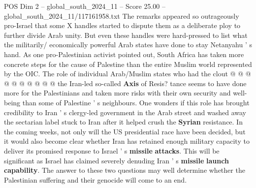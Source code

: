 \begin{textsample}{POS Dim 2 – global\_south\_2024\_11 – Score 25.00 – global\_south\_2024\_11/117161958.txt}
The remarks appeared so outrageously pro-Israel that some X handles started to dispute them as a deliberate ploy to further divide Arab unity.
But even these handles were hard-pressed to list what the militarily/ economically powerful Arab states have done to stay Netanyahu ' s hand.
As one pro-Palestinian activist pointed out, South Africa has taken more concrete steps for the cause of Palestine than the entire Muslim world represented by the OIC.
The role of individual Arab/Muslim states who had the clout @ @ @ @ @ @ @ @ @ @ the Iran-led so-called \textbf{Axis} of Resis? tance seems to have done more for the Palestinians and taken more risks with their own security and well-being than some of Palestine ' s neighbours.
One wonders if this role has brought credibility to Iran ' s clergy-led government in the Arab street and washed away the sectarian label stuck to Iran after it helped crush the \textbf{Syrian} resistance.
In the coming weeks, not only will the US presidential race have been decided, but it would also become clear whether Iran has retained enough military capacity to deliver its promised response to Israel ' s \textbf{missile} \textbf{attacks}.
This will be significant as Israel has claimed severely denuding Iran ' s \textbf{missile} \textbf{launch} \textbf{capability}.
The answer to these two questions may well determine whether the Palestinian suffering and their genocide will come to an end.

\end{textsample}
